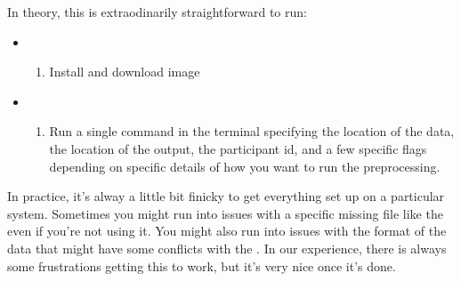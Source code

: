 \documentclass[letterpaper,10pt,english]{sphinxmanual}
\begin{document}
In theory, this is extraodinarily straightforward to run:
\begin{itemize}
\item {} \begin{enumerate}
%
\item {} 
Install  and download image

\end{enumerate}


\item {} \begin{enumerate}
%
\item {} 
Run a single command in the terminal specifying the location of the data, the location of the output, the participant id, and a few specific flags depending on specific details of how you want to run the preprocessing.

\end{enumerate}


\end{itemize}

In practice, it’s alway a little bit finicky to get everything set up on a particular system. Sometimes you might run into issues with a specific missing file like the  even if you’re not using it. You might also run into issues with the format of the data that might have some conflicts with the . In our experience, there is always some frustrations getting this to work, but it’s very nice once it’s done.
\end{document}
